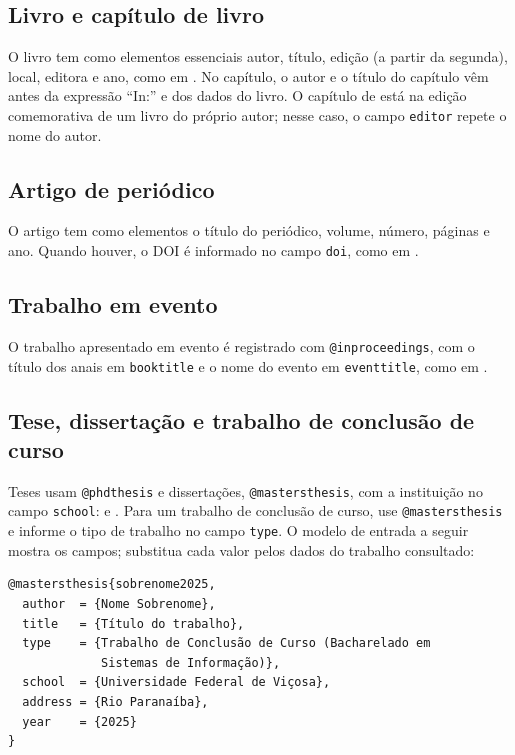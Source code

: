 \subsection{Livro e capítulo de livro}

O livro tem como elementos essenciais autor, título, edição (a partir da segunda), local, editora e ano, como em . No capítulo, o autor e o título do capítulo vêm antes da expressão ``In:'' e dos dados do livro. O capítulo de  está na edição comemorativa de um livro do próprio autor; nesse caso, o campo \texttt{editor} repete o nome do autor.

\subsection{Artigo de periódico}

O artigo tem como elementos o título do periódico, volume, número, páginas e ano. Quando houver, o DOI é informado no campo \texttt{doi}, como em .

\subsection{Trabalho em evento}

O trabalho apresentado em evento é registrado com \texttt{@inproceedings}, com o título dos anais em \texttt{booktitle} e o nome do evento em \texttt{eventtitle}, como em .

\subsection{Tese, dissertação e trabalho de conclusão de curso}\label{sec:tcc}

Teses usam \texttt{@phdthesis} e dissertações, \texttt{@mastersthesis}, com a instituição no campo \texttt{school}:  e . Para um trabalho de conclusão de curso, use \texttt{@mastersthesis} e informe o tipo de trabalho no campo \texttt{type}. O modelo de entrada a seguir mostra os campos; substitua cada valor pelos dados do trabalho consultado:

\begin{verbatim}
@mastersthesis{sobrenome2025,
  author  = {Nome Sobrenome},
  title   = {Título do trabalho},
  type    = {Trabalho de Conclusão de Curso (Bacharelado em
             Sistemas de Informação)},
  school  = {Universidade Federal de Viçosa},
  address = {Rio Paranaíba},
  year    = {2025}
}
\end{verbatim}

